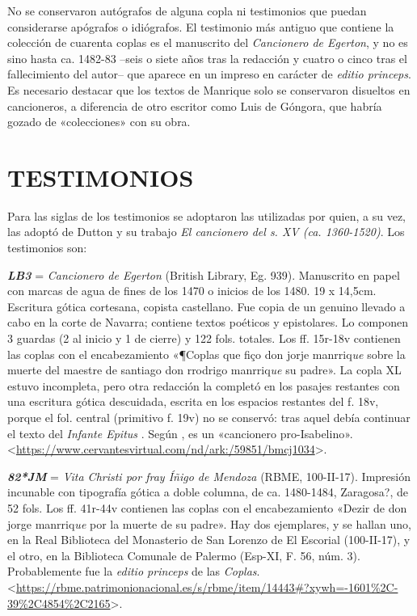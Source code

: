 \documentclass[11pt]{article}
\newcommand{\eg}{{\emph{\textbf{LB3}}}}
\newcommand{\jm}{\emph{\textbf{82*JM}}}
\newcommand{\comillas}[1]{«#1»}
\begin{document}
%
No se conservaron autógrafos de alguna copla ni testimonios que puedan considerarse apógrafos o idiógrafos. El testimonio más antiguo que contiene la colección de cuarenta coplas es el manuscrito del \emph{Cancionero de Egerton}, y no es sino hasta ca. 1482-83 --seis o siete años tras la redacción y cuatro o cinco tras el fallecimiento del autor-- que aparece en un impreso en carácter de \emph{editio princeps}. Es necesario destacar que los textos de Manrique solo se conservaron disueltos en cancioneros, a diferencia de otro escritor como Luis de Góngora, que habría gozado de \comillas{colecciones} con su obra.\par
%
\section*{\centering\textsc{TESTIMONIOS}}
%
\noindent Para las siglas de los testimonios se adoptaron las utilizadas por \textcite{PérezPriego2017} quien, a su vez, 
las adoptó de Dutton y su trabajo \emph{El cancionero del s. XV (ca. 1360-1520)}. Los testimonios son:\par
%
{\eg} = \emph{Cancionero de Egerton} (British Library, Eg. 939).
%
Manuscrito en papel con marcas de agua de fines de los 1470 o inicios de los 1480. 19 x 14,5cm. Escritura gótica cortesana, copista castellano. Fue copia de un genuino llevado a cabo en la corte de Navarra; contiene textos poéticos y epistolares. Lo componen 3 guardas (2 al inicio y 1 de cierre) y 122 fols. totales. Los ff. 15r-18v contienen las coplas con el encabezamiento \comillas{¶Coplas que fiço don jorje manrriq\emph{ue} sobre la muerte del maestre de santiago don rrodrigo manrriq\emph{ue} su padre}. La copla XL estuvo incompleta, pero otra redacción la completó en los pasajes restantes con una escritura gótica descuidada, escrita en los espacios restantes del f. 18v, porque el fol. central (primitivo f. 19v) no se conservó: tras aquel debía continuar el texto del \emph{Infante Epitus} \parencite{Beltrán2011}. Según \textcite{Severin2000}, es un \comillas{cancionero pro-Isabelino}. <\url{https://www.cervantesvirtual.com/nd/ark:/59851/bmcj1034}>.\par
%
{\jm} = \emph{Vita Christi por fray Íñigo de Mendoza} (RBME, 100-II-17).
%
Impresión incunable con tipografía gótica a doble columna, de ca. 1480-1484, Zaragosa?, de 52 fols. Los ff. 41r-44v contienen las coplas con el encabezamiento \comillas{Dezir de don jorge manrriq\emph{ue} por la muerte de su padre}. Hay dos ejemplares, y se hallan uno, en la Real Biblioteca del Monasterio de San Lorenzo de El Escorial (100-II-17), y el otro, en la Biblioteca Comunale de Palermo (Esp-XI, F. 56, núm. 3). Probablemente fue la \emph{editio princeps} de las \emph{Coplas}. <\url{https://rbme.patrimonionacional.es/s/rbme/item/14443#?xywh=-1601\%2C-39\%2C4854\%2C2165}>.\par
\end{document}
